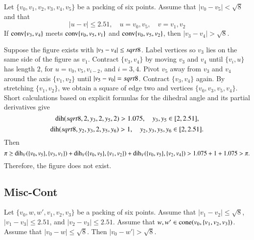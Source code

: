 \begin{tarskidata}
\begin{tarski}
\begin{lemma} 
Let $\{v_0,v_1,v_2,v_3,v_4,v_5\}$ be a packing of six points.
Assume that $|v_0-v_5|<\sqrt8$ and that
  $$|u-v| \le 2.51,\quad u=v_0,v_5,\quad v = v_1,v_2$$
If ${\operatorname{conv}}\{v_3,v_4\}$ meets 
${\operatorname{conv}}\{v_0,v_5,v_1\}$ and ${\operatorname{conv}}\{v_0,v_5,v_2\}$,
then $|v_3-v_4|>\sqrt8$.
\end{lemma}

\begin{proved}
Suppose the figure exists with $|v_3-v_4|\le sqrt8$. Label vertices
so $v_3$ lies on the same side of the figure as $v_1$. Contract
$\{v_3,v_4\}$ by moving $v_3$ and $v_4$ until
    $\{v_i,u\}$ has length $2$,
for $u=v_0,v_5,v_{i-2}$, and $i=3,4$. Pivot $v_5$ away from $v_3$ and
$v_4$ around the axis $\{v_1,v_2\}$ until
    $|v_5-v_0|=sqrt8$.
Contract $\{v_3,v_4\}$ again. By stretching $\{v_1,v_2\}$, we
obtain a square of edge two and vertices $\{v_0,v_3,v_5,v_4\}$. Short
calculations based on explicit formulas for the dihedral angle and
its partial derivatives give
    $$
        \operatorname{dih}(sqrt8,2,y_3,2,y_5,2) > 1.075,\quad
        y_3,y_5\in[2,2.51],
    $$
    $$
    \operatorname{dih}(sqrt8,y_2,y_3,2,y_5,y_6) >1,\quad
        y_2,y_3,y_5,y_6\in[2,2.51].
   $$
Then
$$\pi\ge \operatorname{dih}_V(\{v_0,v_5\},\{v_3,v_1\}) + \operatorname{dih}_V(\{v_0,v_5\},\{v_1,v_2\}) + 
\operatorname{dih}_V(\{v_0,v_5\},\{v_2,v_4\})
    > 1.075 + 1 + 1.075 > \pi .$$
Therefore, the figure does not exist.
\swallowed\end{proved}
\end{tarski}










\begin{tarski}
\section{Misc-Cont}

\begin{lemma} 
Let $\{v_0,w,w',v_1,v_2,v_3\}$ be a packing of six points.
Assume that  $|v_1-v_2|\le\sqrt8$,
$|v_1-v_3|\le 2.51$, and $|v_2-v_3|\le 2.51$.
Assume that $w,w'\in{\operatorname{cone}}(v_0,\{v_1,v_2,v_3\})$.
Assume that $|v_0-w|\le\sqrt8$.  Then $|v_0-w'| > \sqrt8$.
\end{lemma}


\end{tarski}
\end{tarskidata}
